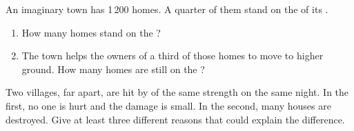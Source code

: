 \begin{exercise}[$\star\star$]\label{exo:g5:natural-hazards:10}
An imaginary town has 1\,200 homes. A quarter of them stand on the
 of its .
\begin{enumerate}
  \item[(a)] How many homes stand on the ?
  \item[(b)] The town helps the owners of a third of those homes to move to
        higher ground. How many homes are still on the ?
\end{enumerate}
\end{exercise}

\begin{exercise}[$\star\star\star$]\label{exo:g5:natural-hazards:11}
Two villages, far apart, are hit by  of the same strength on the same
night. In the first, no one is hurt and the damage is small. In the second,
many houses are destroyed. Give at least three different reasons that could
explain the difference.
\end{exercise}
